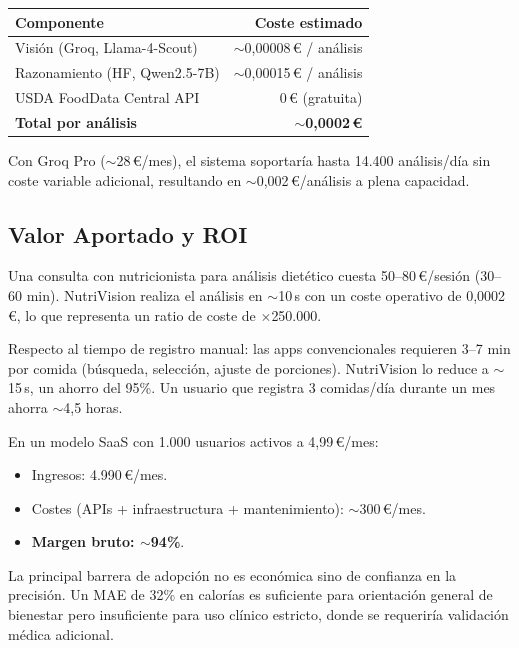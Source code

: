 \documentclass[10pt,a4paper]{article}
\begin{document}
\begin{center}
\begin{tabular}{lr}
\toprule
\textbf{Componente} & \textbf{Coste estimado} \\
\midrule
Visión (Groq, Llama-4-Scout)   & $\sim$0,00008\,€ / análisis \\
Razonamiento (HF, Qwen2.5-7B)  & $\sim$0,00015\,€ / análisis \\
USDA FoodData Central API       & 0\,€ (gratuita) \\
\midrule
\textbf{Total por análisis}    & \textbf{$\sim$0,0002\,€} \\
\bottomrule
\end{tabular}
\end{center}

Con Groq Pro ($\sim$28\,€/mes), el sistema soportaría hasta 14.400 análisis/día sin coste variable
adicional, resultando en $\sim$0,002\,€/análisis a plena capacidad.

\subsection{Valor Aportado y ROI}

Una consulta con nutricionista para análisis dietético cuesta 50–80\,€/sesión (30–60 min).
NutriVision realiza el análisis en $\sim$10\,s con un coste operativo de 0,0002\,€, lo que representa
un ratio de coste de $\times$250.000.

Respecto al tiempo de registro manual: las apps convencionales requieren 3–7 min por comida (búsqueda,
selección, ajuste de porciones). NutriVision lo reduce a $\sim$15\,s, un ahorro del 95\%. Un
usuario que registra 3 comidas/día durante un mes ahorra $\sim$4,5 horas.

En un modelo SaaS con 1.000 usuarios activos a 4,99\,€/mes:
\begin{itemize}[noitemsep, topsep=2pt]
  \item Ingresos: 4.990\,€/mes.
  \item Costes (APIs + infraestructura + mantenimiento): $\sim$300\,€/mes.
  \item \textbf{Margen bruto: $\sim$94\%}.
\end{itemize}

La principal barrera de adopción no es económica sino de confianza en la precisión. Un MAE de 32\%
en calorías es suficiente para orientación general de bienestar pero insuficiente para uso clínico
estricto, donde se requeriría validación médica adicional.
\end{document}
